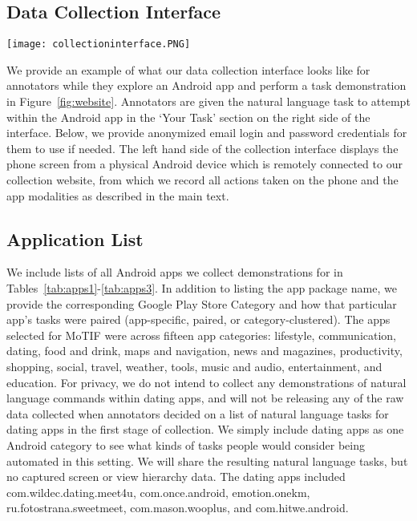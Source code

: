 \subsection{Data Collection Interface}
\label{interface}
\begin{figure*}[t]
    \centering
    \texttt{[image: collectioninterface.PNG]}
    \caption{The website interface annotators use to interact with an Android app and record their task demonstration. We provide anonymized information if needed for logging in or for forms at any point so that no personal identifying information is collected}
    \label{fig:website}
\end{figure*}
We provide an example of what our data collection interface looks like for annotators while they explore an Android app and perform a task demonstration in Figure~\ref{fig:website}. Annotators are given the natural language task to attempt within the Android app in the `Your Task' section on the right side of the interface. Below, we provide anonymized email login and password credentials for them to use if needed. The left hand side of the collection interface displays the phone screen from a physical Android device which is remotely connected to our collection website, from which we record all actions taken on the phone and the app modalities as described in the main text.

\subsection{Application List}
We include lists of all Android apps we collect demonstrations for in Tables~\ref{tab:apps1}-\ref{tab:apps3}. In addition to listing the app package name, we provide the corresponding Google Play Store Category and how that particular app's tasks were paired (app-specific, paired, or category-clustered). The apps selected for MoTIF were across fifteen app categories: lifestyle, communication, dating, food and drink, maps and navigation, news and magazines, productivity, shopping, social, travel, weather, tools, music and audio, entertainment, and education. For privacy, we do not intend to collect any demonstrations of natural language commands within dating apps, and will not be releasing any of the raw data collected when annotators decided on a list of natural language tasks for dating apps in the first stage of collection. We simply include dating apps as one Android category to see what kinds of tasks people would consider being automated in this setting. We will share the resulting natural language tasks, but no captured screen or view hierarchy data. The dating apps included com.wildec.dating.meet4u, com.once.android, emotion.onekm, ru.fotostrana.sweetmeet, com.mason.wooplus, and com.hitwe.android.

